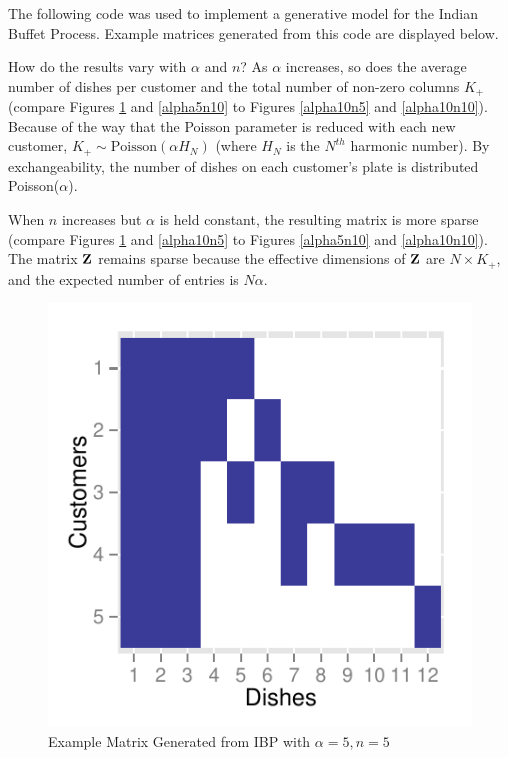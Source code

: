 \documentclass[12pt,letterpaper]{article}
\begin{document}

The following code was used to implement a generative model for the Indian Buffet Process. Example matrices generated from this code are displayed below. 



How do the results vary with $\alpha$ and $n$? As $\alpha$ increases, so does the average number of dishes per customer and the total number of non-zero columns $K_+$ (compare Figures \ref{alpha5n5} and \ref{alpha5n10} to Figures \ref{alpha10n5} and \ref{alpha10n10}). Because of the way that the Poisson parameter is reduced with each new customer, $K_+ \sim \text{Poisson}(\alpha H_N)$ (where $H_N$ is the $N^{th}$ harmonic number). By exchangeability, the number of dishes on each customer's plate is distributed Poisson($\alpha$).

When $n$ increases but $\alpha$ is held constant, the resulting matrix is more sparse (compare Figures \ref{alpha5n5} and \ref{alpha10n5} to Figures \ref{alpha5n10} and \ref{alpha10n10}). The matrix $\bf{Z}$ remains sparse because the effective dimensions of $\bf{Z}$ are $N \times K_+$, and the expected number of entries is $N\alpha$.

\begin{figure}[h!]
\begin{center}
\includegraphics{alpha5n5.pdf}
\caption{Example Matrix Generated from IBP with $\alpha=5, n=5$}
\label{alpha5n5}
\end{center}
\end{figure}
\end{document}
